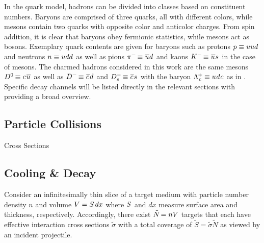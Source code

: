 In the quark model, hadrons can be divided into classes based on constituent numbers. Baryons are comprised of three quarks, all
with different colors, while mesons contain two quarks with opposite color and anticolor charges. From spin addition, it is clear
that baryons obey fermionic statistics, while mesons act as bosons. Exemplary quark contents are given for baryons such as protons
$p \equiv uud \kern+0.5pt$ and neutrons $n \equiv udd \kern+0.5pt$ as well as pions
$\pi^- \kern-1.0pt \equiv \kern+0.75pt \overline{\kern-0.5pt u \kern+0.5pt} d \kern+0.5pt$ and kaons
$K^- \kern-1.0pt \equiv \kern+0.75pt \overline{\kern-0.5pt u \kern+0.5pt} s \kern+0.5pt$ in the case of mesons.
The charmed hadrons considered in this work are the same mesons
$D^0 \kern-0.75pt \equiv c \kern+1.25pt \overline{\kern-0.5pt u \kern+0.5pt} \kern+0.5pt$ as well as
$D^- \kern-1.0pt \equiv \kern+0.5pt \overline{\kern-0.25pt c \kern+0.75pt} d \kern+0.5pt$
and $D^-_s \kern-1.0pt \equiv \kern+0.5pt \overline{\kern-0.25pt c \kern+0.75pt} s \kern+0.5pt$
with the baryon $\Lambda^{\kern-0.5pt +}_{\kern+0.5pt c} \kern-0.5pt \equiv u \kern+0.5pt d \kern+0.5pt c \kern+0.5pt$
as in \cite{Carpio_2020}. Specific decay channels will be listed directly in the relevant sections
with \cite{pdg} providing a broad overview.



\subsection{Particle Collisions}
\label{sub:collisions}

Cross Sections



\subsection{Cooling \& Decay}
\label{sub:cooling}

Consider an infinitesimally thin slice of a target medium with particle number density $n$ and volume $V \kern-0.1pt = S \kern+1.5pt dx$
where $S \kern+0.5pt$ and $dx$ measure surface area and thickness, respectively. Accordingly, there exist $\tilde{N} \kern-1.1pt = nV$
targets that each have effective interaction cross sections $\tilde{\sigma}$ with a total coverage of $\tilde{S} = \tilde{\sigma} \tilde{N}$
as viewed by an incident projectile.

